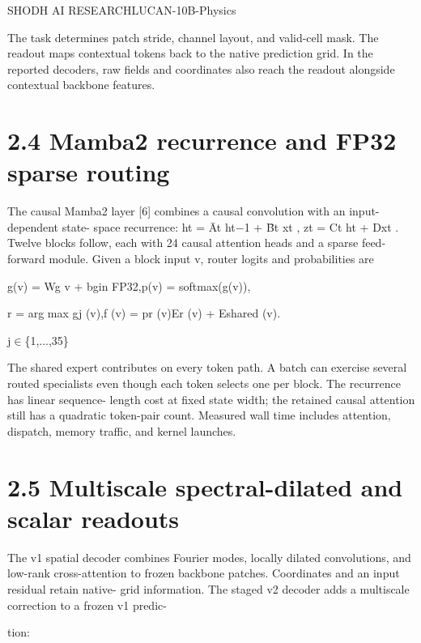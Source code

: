 \documentclass[11pt]{article}
\begin{document}


\noindent SHODH AI RESEARCH\quad LUCAN-10B-Physics\par



The task determines patch stride, channel layout, and valid-cell mask. The readout maps
contextual tokens back to the native prediction grid. In the reported decoders, raw fields
and coordinates also reach the readout alongside contextual backbone features.

\section*{2.4 Mamba2 recurrence and FP32 sparse routing}

The causal Mamba2 layer [6] combines a causal convolution with an input-dependent state-
space recurrence:
ht = Āt ht\ensuremath{-}1 + B̄t xt ,  zt = Ct ht + Dxt .
Twelve blocks follow, each with 24 causal attention heads and a sparse feed-forward module.
Given a block input v, router logits and probabilities are

\noindent g(v) = Wg v + bg\quad in FP32,\quad p(v) = softmax(g(v)),\par


\noindent r = arg max gj (v),\quad f (v) = pr (v)Er (v) + Eshared (v).\par

j\ensuremath{\in}\{1,...,35\}

The shared expert contributes on every token path. A batch can exercise several routed
specialists even though each token selects one per block. The recurrence has linear sequence-
length cost at fixed state width; the retained causal attention still has a quadratic token-pair
count. Measured wall time includes attention, dispatch, memory traffic, and kernel launches.

\section*{2.5 Multiscale spectral-dilated and scalar readouts}

The v1 spatial decoder combines Fourier modes, locally dilated convolutions, and low-rank
cross-attention to frozen backbone patches. Coordinates and an input residual retain native-
grid information. The staged v2 decoder adds a multiscale correction to a frozen v1 predic-

\noindent tion:\quad [U+0010]\quad [U+0011]\par
\end{document}
